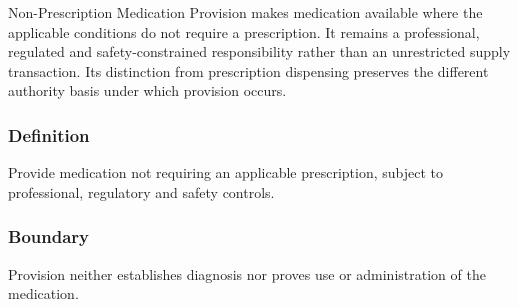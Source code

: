 Non-Prescription Medication Provision makes medication available where the applicable conditions do not require a prescription. It remains a professional, regulated and safety-constrained responsibility rather than an unrestricted supply transaction. Its distinction from prescription dispensing preserves the different authority basis under which provision occurs.

\subsubsection*{Definition}

Provide medication not requiring an applicable prescription, subject to professional, regulatory and safety controls.

\subsubsection*{Boundary}

Provision neither establishes diagnosis nor proves use or administration of the medication.


